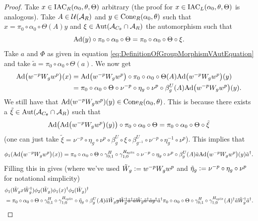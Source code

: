 \documentclass[11pt,a4paper,twoside]{article}
\numberwithin{equation}{section}
\begin{document}
	\begin{proof}
		Take $x\in \textrm{IAC}_R(\alpha_0,\theta,\Theta)$ arbitrary (the proof for $x\in \textrm{IAC}_L(\alpha_0,\theta,\Theta)$ is analogous). Take $A\in\mathcal U(\mathcal A_R)$ and $y\in\textrm{Cone}_R(\alpha_0,\theta)$ such that $x=\pi_0\circ\alpha_0\circ\Theta(A)y$ and $\xi\in\Aut{\AA_{C_\theta}\cap \AA_R}$ the automorphism such that
		\begin{equation}
			\Ad{y}\circ\pi_0\circ\alpha_0\circ\Theta=\pi_0\circ\alpha_0\circ\Theta\circ\xi.
		\end{equation}
		Take $a$ and $\Phi$ as given in equation \eqref{eq:DefinitionOfGroupMorphismVAutEquation} and take $\tilde{a}=\pi_0\circ\alpha_0\circ\Theta(a)$. We now get
		\begin{align}
			\Ad{w^{-p}W_gw^{p}} (x) &=\Ad{w^{-p}W_gw^{p}}\circ\pi_0\circ\alpha_0\circ\Theta(A) \Ad{w^{-p}W_gw^{p}}(y)\\
			\nonumber
			&=\pi_0\circ\alpha_0\circ\Theta\circ\nu^{-p}\circ\eta_g\circ\nu^{p}\circ\beta_g^U(A) \Ad{w^{-p}W_gw^{p}}(y).
		\end{align}
		We still have that $\Ad{w^{-p}W_gw^{p}}(y)\in\cone_R(\alpha_0,\theta)$. This is because there exists a $\tilde{\xi}\in\Aut{\AA_{C_\theta}\cap \AA_R}$ such that
		\begin{equation}
			\Ad{\Ad{w^{-p}W_gw^{p}}(y)}\circ \pi_0\circ\alpha_0\circ\Theta=\pi_0\circ\alpha_0\circ\Theta\circ\tilde\xi
		\end{equation}
		(one can just take $\tilde\xi=\nu^{-p}\circ\eta_g\circ\nu^{p}\circ\beta_g^U\circ\xi\circ\beta_{g^{-1}}^U\circ\nu^{-p}\circ\eta_g^{-1}\circ\nu^{p}$). This implies that
		\begin{equation}\label{eq:lem:phi1phi2matchingCondition:Proof_W_g_PartAppendix}
			\phi_1(\Ad{w^{-p}W_gw^{p}}(x))=\pi_0\circ\alpha_0\circ\Theta\circ\gamma^{H}_{0;1}\circ\gamma^{\Hsplit}_{1;0}\circ\nu^{-p}\circ\eta_g\circ\nu^{p}\circ\beta_g^U(A)\tilde{a}\Ad{w^{-p}W_gw^{p}}(y)\tilde{a}^\dagger.
		\end{equation}
		Filling this in gives (where we've used $\tilde{W}_g\vcentcolon= w^{-p}W_g w^{p}$ and $\tilde{\eta}_g\vcentcolon= \nu^{-p}\circ\eta_g\circ\nu^{p}$ for notational simplicity)
		\begin{align}
			\label{eq:phi1phi2matchingConditionEquationAppendix}
			&\phi_1(\tilde{W}_gx\tilde{W}_g^\dagger)\phi_2(\tilde{W}_g)\phi_1(x)^\dagger\phi_2(\tilde{W}_g)^\dagger\\
			\nonumber
			&=\pi_0\circ\alpha_0\circ\Theta\circ\gamma^{H}_{0;1}\circ\gamma^{\Hsplit}_{1;0}\circ\tilde{\eta}_g\circ\beta_g^U(A)\tilde{a}\tilde{W}_g\stkout{y\tilde{W}_g^\dagger\tilde{a}^\dagger}\stkout{\tilde{a}\tilde{W}_g\tilde{a}^\dagger\tilde{a}y^\dagger}\tilde{a}^\dagger\pi_0\circ\alpha_0\circ\Theta\circ\gamma^{H}_{0;1}\circ\gamma^{\Hsplit}_{1;0}(A)^\dagger\tilde{a}\tilde{W}_g^\dagger\tilde{a}^\dagger.

\end{align}
\end{proof}
\end{document}
